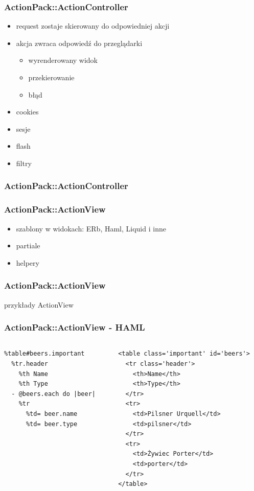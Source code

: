 \documentclass[12t]{beamer}
\begin{document}
\begin{frame}
  \frametitle{ActionPack::ActionController}
  \begin{itemize}
  \item request zostaje skierowany do odpowiedniej akcji
  \item akcja zwraca odpowiedź do przeglądarki
    \begin{itemize}
    \item wyrenderowany widok
    \item przekierowanie
    \item błąd
    \end{itemize}
  \item cookies
  \item sesje
  \item flash
  \item filtry
  \end{itemize}
\end{frame}

\begin{frame}
  \frametitle{ActionPack::ActionController}
  
\end{frame}

\begin{frame}
  \frametitle{ActionPack::ActionView}
  \begin{itemize}
  \item szablony w widokach: ERb, Haml, Liquid i inne
  \item partiale
  \item helpery
  \end{itemize}
\end{frame}

\begin{frame}
  \frametitle{ActionPack::ActionView}
  przykłady ActionView
\end{frame}

\begin{frame}[fragile]
  \frametitle{ActionPack::ActionView - HAML}
  \begin{footnotesize}
  \begin{columns}[T]
    \begin{column}{4cm}

\begin{verbatim}
%table#beers.important
  %tr.header
    %th Name
    %th Type
  - @beers.each do |beer|
    %tr
      %td= beer.name
      %td= beer.type
\end{verbatim}

    \end{column}

    \begin{column}{6cm}
\begin{verbatim}
<table class='important' id='beers'>
  <tr class='header'>
    <th>Name</th>
    <th>Type</th>
  </tr>
  <tr>
    <td>Pilsner Urquell</td>
    <td>pilsner</td>
  </tr>
  <tr>
    <td>Żywiec Porter</td>
    <td>porter</td>
  </tr>
</table>
\end{verbatim}

    \end{column}
  \end{columns}
  \end{footnotesize}
\end{frame}
\end{document}
